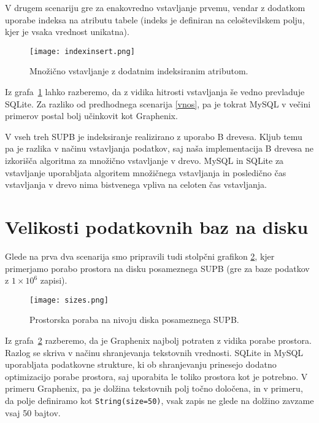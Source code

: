 \documentclass[a4paper,12pt,openright]{book}
\begin{document}
    V drugem scenariju gre za enakovredno vstavljanje prvemu, vendar z dodatkom uporabe indeksa na atributu tabele (indeks je definiran na celoštevilskem polju, kjer je vsaka vrednost unikatna).
    
    \begin{figure}[H]
        \centerline{\texttt{[image: indexinsert.png]}}
        \caption{Množično vstavljanje z dodatnim indeksiranim atributom.}
        \label{index_vnos}
    \end{figure}

    \noindent
    Iz grafa~\ref{index_vnos} lahko razberemo, da z vidika hitrosti vstavljanja še vedno prevladuje SQLite. Za razliko od predhodnega scenarija \ref{vnos}, pa je tokrat MySQL v večini primerov postal bolj učinkovit kot Graphenix.

    V vseh treh SUPB je indeksiranje realizirano z uporabo B drevesa. Kljub temu pa je razlika v načinu vstavljanja podatkov, saj naša implementacija B drevesa ne izkorišča algoritma za množično vstavljanje v drevo. MySQL in SQLite za vstavljanje uporabljata algoritem množičnega vstavljanja in posledično čas vstavljanja v drevo nima bistvenega vpliva na celoten čas vstavljanja.
 
    \section{Velikosti podatkovnih baz na disku}
    \label{size_analysis}

    Glede na prva dva scenarija smo pripravili tudi stolpčni grafikon \ref{velikosti}, kjer primerjamo porabo prostora na disku posameznega SUPB (gre za baze podatkov z $1 \times 10^6$ zapisi). 
    
    \begin{figure}[H]
        \centerline{\texttt{[image: sizes.png]}}
        \caption{Prostorska poraba na nivoju diska posameznega SUPB.}
        \label{velikosti}
    \end{figure}

    \noindent
    Iz grafa~\ref{velikosti} razberemo, da je Graphenix najbolj potraten z vidika porabe prostora. Razlog se skriva v načinu shranjevanja tekstovnih vrednosti. SQLite in MySQL uporabljata podatkovne strukture, ki ob shranjevanju prinesejo dodatno optimizacijo porabe prostora, saj uporabita le toliko prostora kot je potrebno. V primeru Graphenix, pa je dolžina tekstovnih polj točno določena, in v primeru, da polje definiramo kot {\tt String(size=50)}, vsak zapis ne glede na dolžino zavzame vsaj 50 bajtov.
\end{document}
